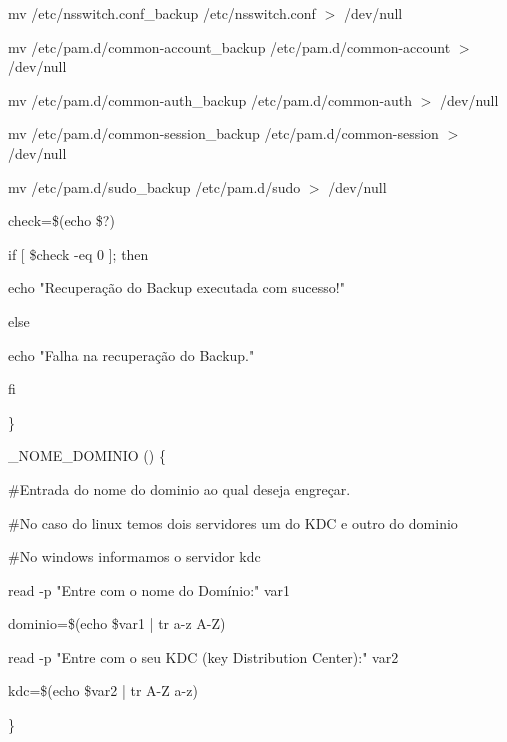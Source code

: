         mv /etc/nsswitch.conf\_backup /etc/nsswitch.conf $>$ /dev/null

        mv /etc/pam.d/common-account\_backup /etc/pam.d/common-account $>$ /dev/null

        mv /etc/pam.d/common-auth\_backup /etc/pam.d/common-auth $>$ /dev/null
        
        mv /etc/pam.d/common-session\_backup /etc/pam.d/common-session $>$ /dev/null

        mv /etc/pam.d/sudo\_backup /etc/pam.d/sudo $>$ /dev/null
         
        
				check=\$(echo \$?)

   if [ \$check -eq 0 ]; then

      echo "Recuperação do Backup executada com sucesso!"

   else

      echo "Falha na recuperação do Backup."

   fi
         
\}

\_NOME\_DOMINIO () \{
 
   \#Entrada do nome do dominio ao qual deseja engreçar.

	 \#No caso do linux temos dois servidores um do KDC e outro do dominio

	 \#No windows informamos o servidor kdc

    read -p "Entre com o nome do Domínio:" var1

    dominio=\$(echo \$var1 | tr a-z A-Z)

    read -p "Entre com o seu KDC (key Distribution Center):" var2

    kdc=\$(echo \$var2 | tr A-Z a-z)         

\}

